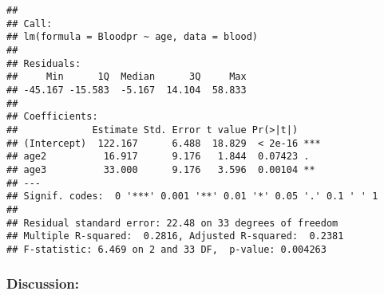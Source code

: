 \documentclass[
]{article}
\begin{document}
\begin{verbatim}
## 
## Call:
## lm(formula = Bloodpr ~ age, data = blood)
## 
## Residuals:
##     Min      1Q  Median      3Q     Max 
## -45.167 -15.583  -5.167  14.104  58.833 
## 
## Coefficients:
##             Estimate Std. Error t value Pr(>|t|)    
## (Intercept)  122.167      6.488  18.829  < 2e-16 ***
## age2          16.917      9.176   1.844  0.07423 .  
## age3          33.000      9.176   3.596  0.00104 ** 
## ---
## Signif. codes:  0 '***' 0.001 '**' 0.01 '*' 0.05 '.' 0.1 ' ' 1
## 
## Residual standard error: 22.48 on 33 degrees of freedom
## Multiple R-squared:  0.2816, Adjusted R-squared:  0.2381 
## F-statistic: 6.469 on 2 and 33 DF,  p-value: 0.004263
\end{verbatim}

\hypertarget{discussion-5}{%
\subsubsection{Discussion:}\label{discussion-5}}
\end{document}
